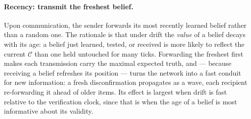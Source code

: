 \documentclass{article}
\begin{document}
\paragraph{Recency: transmit the freshest belief.} Upon communication, the sender forwards its most recently learned belief rather than a random one. The rationale is that under drift the \emph{value} of a belief decays with its age: a belief just learned, tested, or received is more likely to reflect the current $\mathcal{C}$ than one held untouched for many ticks. Forwarding the freshest first makes each transmission carry the maximal expected truth, and --- because receiving a belief refreshes its position --- turns the network into a fast conduit for new information: a fresh disconfirmation propagates as a wave, each recipient re-forwarding it ahead of older items. Its effect is largest when drift is fast relative to the verification clock, since that is when the age of a belief is most informative about its validity.
\end{document}
